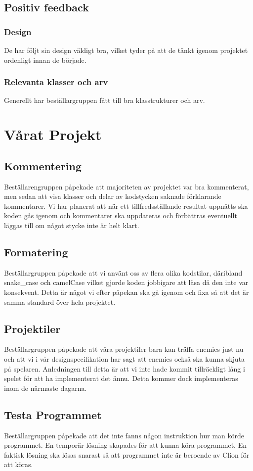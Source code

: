 \documentclass{TDP005mall}
\begin{document}
\subsection{Positiv feedback}

\subsubsection{Design}
De har följt sin design väldigt bra, vilket tyder på att de tänkt igenom projektet ordenligt innan de började.

\subsubsection{Relevanta klasser och arv}
Generellt har beställargruppen fått till bra klasstrukturer och arv.



\section{Vårat Projekt}
\subsection{Kommentering}
Beställarengruppen påpekade att majoriteten av projektet var bra kommenterat, men sedan att visa klasser och delar av kodstycken saknade förklarande kommentarer.
Vi har planerat att när ett tillfredsställande resultat uppnåtts ska koden gås igenom och kommentarer ska uppdateras och förbättras eventuellt läggas till om något stycke inte är helt klart.

\subsection{Formatering}
Beställargruppen påpekade att vi använt oss av flera olika kodstilar,
däribland snake\_case och camelCase vilket gjorde koden jobbigare att läsa då den inte var konsekvent.
Detta är något vi efter påpekan ska gå igenom och fixa så att det är samma standard över hela projektet.

\subsection{Projektiler}
Beställargruppen påpekade att våra projektiler bara kan träffa enemies just nu och att vi i vår designspecifikation har sagt att enemies också ska kunna skjuta på spelaren.
Anledningen till detta är att vi inte hade kommit tillräckligt lång i spelet för att ha implementerat det ännu.
Detta kommer dock implementeras inom de närmaste dagarna.

\subsection{Testa Programmet}
Beställargruppen påpekade att det inte fanns någon instruktion hur man körde programmet.
En temporär lösning skapades för att kunna köra programmet.
En faktisk lösning ska lösas snarast så att programmet inte är beroende av Clion för att köras.
\end{document}
